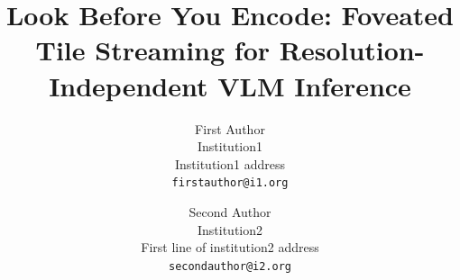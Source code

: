 \documentclass[10pt,twocolumn,letterpaper]{article}
\title{Look Before You Encode: Foveated Tile Streaming for Resolution-Independent VLM Inference}
\author{First Author\\
Institution1\\
Institution1 address\\
{\tt\small firstauthor@i1.org}
\and
Second Author\\
Institution2\\
First line of institution2 address\\
{\tt\small secondauthor@i2.org}
}
\begin{document}
\maketitle







{
    \small
    
    
}

\clearpage
\setcounter{page}{1}
\renewcommand{\thepage}{S\arabic{page}}
\setcounter{section}{0}
\setcounter{table}{0}
\setcounter{figure}{0}
\setcounter{algorithm}{0}
\renewcommand{\thesection}{S\arabic{section}}
\renewcommand{\thetable}{S\arabic{table}}
\renewcommand{\thefigure}{S\arabic{figure}}
\renewcommand{\thealgorithm}{S\arabic{algorithm}}
\renewcommand{\theHsection}{S\arabic{section}}
\renewcommand{\theHtable}{S\arabic{table}}
\renewcommand{\theHfigure}{S\arabic{figure}}
\renewcommand{\theHalgorithm}{S\arabic{algorithm}}
\makeatletter\setlength{\@dblfptop}{0pt}\makeatother
\maketitlesupplementary
\let\origtable\table \let\endorigtable\endtable
\renewenvironment{table}[1][]{\origtable[!htbp]}{\endorigtable}
\let\origfigure\figure \let\endorigfigure\endfigure
\renewenvironment{figure}[1][]{\origfigure[!htbp]}{\endorigfigure}
\let\origalgorithm\algorithm \let\endorigalgorithm\endalgorithm
\renewenvironment{algorithm}[1][]{\origalgorithm[!htbp]}{\endorigalgorithm}








\end{document}
